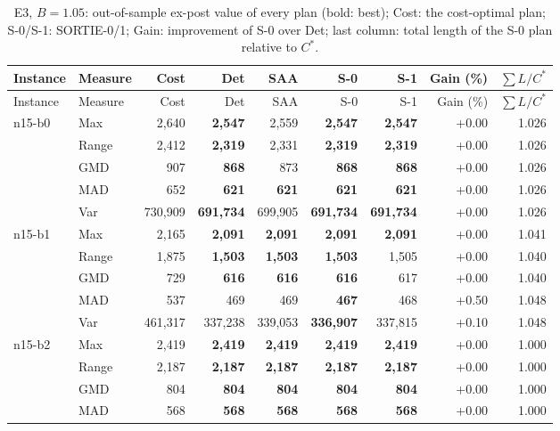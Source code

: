 \begin{small}
\begin{longtable}{llrrrrrrr}
\caption{E3, $B=1.05$: out-of-sample ex-post value of every plan (bold: best); Cost: the cost-optimal plan; S-0/S-1: SORTIE-0/1; Gain: improvement of S-0 over Det; last column: total length of the S-0 plan relative to $C^\ast$.}\label{tab:app_e3_105}\\
\toprule
Instance & Measure & Cost & Det & SAA & S-0 & S-1 & Gain (\%) & $\sum L/C^\ast$\\
\midrule
\endfirsthead
\toprule
Instance & Measure & Cost & Det & SAA & S-0 & S-1 & Gain (\%) & $\sum L/C^\ast$\\
\midrule
\endhead
\bottomrule
\endfoot
n15-b0 & Max & 2,640 & \textbf{2,547} & 2,559 & \textbf{2,547} & \textbf{2,547} & +0.00 & 1.026 \\
 & Range & 2,412 & \textbf{2,319} & 2,331 & \textbf{2,319} & \textbf{2,319} & +0.00 & 1.026 \\
 & GMD & 907 & \textbf{868} & 873 & \textbf{868} & \textbf{868} & +0.00 & 1.026 \\
 & MAD & 652 & \textbf{621} & \textbf{621} & \textbf{621} & \textbf{621} & +0.00 & 1.026 \\
 & Var & 730,909 & \textbf{691,734} & 699,905 & \textbf{691,734} & \textbf{691,734} & +0.00 & 1.026 \\
n15-b1 & Max & 2,165 & \textbf{2,091} & \textbf{2,091} & \textbf{2,091} & \textbf{2,091} & +0.00 & 1.041 \\
 & Range & 1,875 & \textbf{1,503} & \textbf{1,503} & \textbf{1,503} & 1,505 & +0.00 & 1.040 \\
 & GMD & 729 & \textbf{616} & \textbf{616} & \textbf{616} & 617 & +0.00 & 1.040 \\
 & MAD & 537 & 469 & 469 & \textbf{467} & 468 & +0.50 & 1.048 \\
 & Var & 461,317 & 337,238 & 339,053 & \textbf{336,907} & 337,815 & +0.10 & 1.048 \\
n15-b2 & Max & 2,419 & \textbf{2,419} & \textbf{2,419} & \textbf{2,419} & \textbf{2,419} & +0.00 & 1.000 \\
 & Range & 2,187 & \textbf{2,187} & \textbf{2,187} & \textbf{2,187} & \textbf{2,187} & +0.00 & 1.000 \\
 & GMD & 804 & \textbf{804} & \textbf{804} & \textbf{804} & \textbf{804} & +0.00 & 1.000 \\
 & MAD & 568 & \textbf{568} & \textbf{568} & \textbf{568} & \textbf{568} & +0.00 & 1.000 \\

\end{longtable}
\end{small}

